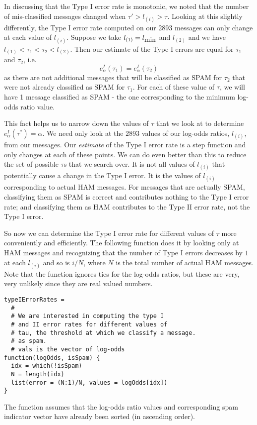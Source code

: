 \documentclass{article}
\begin{document}
In discussing that the Type I error rate is monotonic, we noted that
the number of mis-classified messages changed when $\tau' > l_{(i)} >
\tau$.  Looking at this slightly differently,
the Type I error rate computed on our
2893 messages can only change at each value
of $l_{(i)}$.
Suppose we take
$l_{(1)} = l_{\hbox{min}}$ and
$l_{(2)}$ and we have 
$l_{(1)} < \tau_1 < \tau_2 < l_{(2)}$.
Then our estimate of the Type I errors
are equal for $\tau_1$ and $\tau_2$,
i.e.
$$e_\alpha^I(\tau_1) = e^I_\alpha(\tau_2)$$ as there are not
additional messages that will be classified as SPAM for $\tau_2$ that
were not already classified as SPAM for $\tau_1$.  For each of these
value of $\tau$, we will have 1 message classified as SPAM - the one
corresponding to the minimum log-odds ratio value.

This fact helps us to narrow down the values of $\tau$ that we look at
to determine $e^I_\alpha(\tau^\ast) = \alpha$.  We need only look at
the $2893$ values of our log-odds ratios, $l_{(i)}$, from our
messages.  Our \textit{estimate} of the Type I error rate is a step
function and only changes at each of these points.  We can do even
better than this to reduce the set of possible $\tau$s that we search
over.  It is not all values of $l_{(i)}$ that potentially cause a
change in the Type I error.  It is the values of $l_{(i)}$
corresponding to actual HAM messages.  For messages that are actually
SPAM, classifying them as SPAM is correct and contributes nothing to
the Type I error rate; and classifying them as HAM contributes to the
Type II error rate, not the Type I error.

So now we can determine the Type I error rate for different values of
$\tau$ more conveniently and efficiently.  The following function does
it by looking only at HAM messages and recognizing that the number of
Type I errors decreases by $1$ at each $l_{(i)}$ and so is $i/N$,
where $N$ is the total number of actual HAM messages.  Note that the
function ignores ties for the log-odds ratios, but these are very,
very unlikely since they are real valued numbers.
\begin{verbatim}
typeIErrorRates =
  #
  # We are interested in computing the type I
  # and II error rates for different values of
  # tau, the threshold at which we classify a message.
  # as spam.
  # vals is the vector of log-odds
function(logOdds, isSpam) {
  idx = which(!isSpam)
  N = length(idx)
  list(error = (N:1)/N, values = logOdds[idx])
}
\end{verbatim}
The function assumes that the log-odds ratio
values and corresponding spam indicator vector
have already been sorted (in ascending order).
\end{document}
